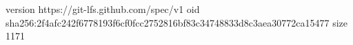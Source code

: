 version https://git-lfs.github.com/spec/v1
oid sha256:2f4afc242f6778193f6cf0fcc2752816bf83c34748833d8c3aea30772ca15477
size 1171
